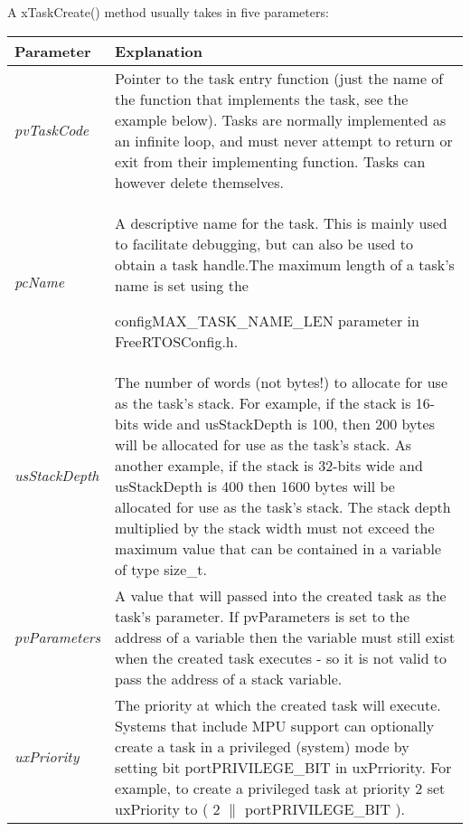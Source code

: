 \documentclass[a4paper,12pt]{report}
\begin{document}
\noindent
A xTaskCreate() method usually takes in five parameters:
\begin{table}[h]
\centering
{\renewcommand\arraystretch{1.25}
\begin{tabular}{|l|l|l|} \hline
Parameter & \multicolumn{2}{l|}{Explanation} \\\hline
\textit{pvTaskCode}& \multicolumn{2}{p{12cm}|}{\raggedright Pointer to the task entry function (just the name of the function that implements the task, see the example below). Tasks are normally implemented as an infinite loop, and must never attempt to return or exit from their implementing function. Tasks can however delete themselves.} \\ \hline
\textit{pcName}& \multicolumn{2}{p{12cm}|}{A descriptive name for the task. This is mainly used to facilitate debugging, but can also be used to obtain a task handle.The maximum length of a task's name is set using the 

configMAX\_TASK\_NAME\_LEN parameter in FreeRTOSConfig.h.} \\ \hline
\textit{usStackDepth}& \multicolumn{2}{p{12cm}|}{\raggedright The number of words (not bytes!) to allocate for use as the task's stack. For example, if the stack is 16-bits wide and usStackDepth is 100, then 200 bytes will be allocated for use as the task's stack. As another example, if the stack is 32-bits wide and usStackDepth is 400 then 1600 bytes will be allocated for use as the task's stack.
The stack depth multiplied by the stack width must not exceed the maximum value that can be contained in a variable of type size\_t.} \\ \hline
\textit{pvParameters}& \multicolumn{2}{p{12cm}|}{\raggedright A value that will passed into the created task as the task's parameter.
If pvParameters is set to the address of a variable then the variable must still exist when the created task executes - so it is not valid to pass the address of a stack variable.} \\ \hline
\textit{uxPriority}& \multicolumn{2}{p{12cm}|}{\raggedright The priority at which the created task will execute. Systems that include MPU support can optionally create a task in a privileged (system) mode by setting bit portPRIVILEGE\_BIT in uxPrriority. For example, to create a privileged task at priority 2 set uxPriority to ( 2 $\|$ portPRIVILEGE\_BIT ).} \\ \hline
\end{tabular}}
\end{table}
\end{document}

